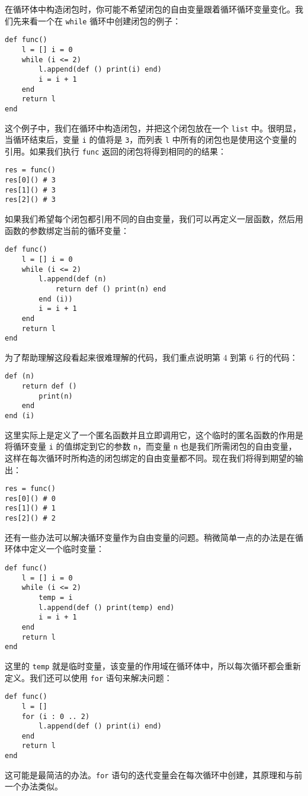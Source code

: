 在循环体中构造闭包时，你可能不希望闭包的自由变量跟着循环循环变量变化。我们先来看一个在 \texttt{while} 循环中创建闭包的例子：
\begin{lstlisting}[language=berry]
def func()
    l = [] i = 0
    while (i <= 2)
        l.append(def () print(i) end)
        i = i + 1
    end
    return l
end
\end{lstlisting}
这个例子中，我们在循环中构造闭包，并把这个闭包放在一个 \texttt{list} 中。很明显，当循环结束后，变量 \texttt{i} 的值将是 \texttt{3}，而列表 \texttt{l} 中所有的闭包也是使用这个变量的引用。如果我们执行 \texttt{func} 返回的闭包将得到相同的的结果：
\begin{lstlisting}[language=berry]
res = func()
res[0]() # 3
res[1]() # 3
res[2]() # 3
\end{lstlisting}
如果我们希望每个闭包都引用不同的自由变量，我们可以再定义一层函数，然后用函数的参数绑定当前的循环变量：
\begin{lstlisting}[language=berry]
def func()
    l = [] i = 0
    while (i <= 2)
        l.append(def (n)
            return def () print(n) end
        end (i))
        i = i + 1
    end
    return l
end
\end{lstlisting}
为了帮助理解这段看起来很难理解的代码，我们重点说明第 4 到第 6 行的代码：
\begin{lstlisting}[language=berry]
def (n)
    return def ()
        print(n)
    end
end (i)
\end{lstlisting}
这里实际上是定义了一个匿名函数并且立即调用它，这个临时的匿名函数的作用是将循环变量 \texttt{i} 的值绑定到它的参数 \texttt{n}，而变量 \texttt{n} 也是我们所需闭包的自由变量，这样在每次循环时所构造的闭包绑定的自由变量都不同。现在我们将得到期望的输出：
\begin{lstlisting}[language=berry]
res = func()
res[0]() # 0
res[1]() # 1
res[2]() # 2
\end{lstlisting}
还有一些办法可以解决循环变量作为自由变量的问题。稍微简单一点的办法是在循环体中定义一个临时变量：
\begin{lstlisting}[language=berry]
def func()
    l = [] i = 0
    while (i <= 2)
        temp = i
        l.append(def () print(temp) end)
        i = i + 1
    end
    return l
end
\end{lstlisting}
这里的 \texttt{temp} 就是临时变量，该变量的作用域在循环体中，所以每次循环都会重新定义。我们还可以使用 \texttt{for} 语句来解决问题：
\begin{lstlisting}[language=berry]
def func()
    l = []
    for (i : 0 .. 2)
        l.append(def () print(i) end)
    end
    return l
end
\end{lstlisting}
这可能是最简洁的办法。\texttt{for} 语句的迭代变量会在每次循环中创建，其原理和与前一个办法类似。
